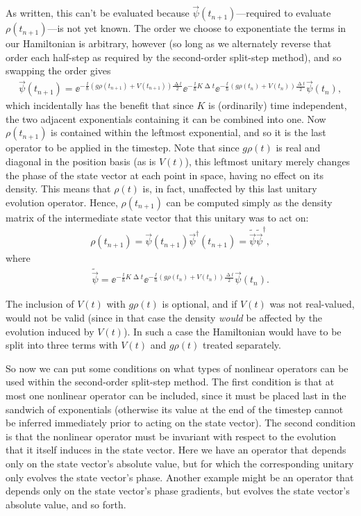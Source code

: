 As written, this can't be evaluated because $\vec \psi(t_{n+1})$---required to evaluate $\rho(t_{n+1})$---is not yet known. The order we choose to exponentiate the terms in our Hamiltonian is arbitrary, however (so long as we alternately reverse that order each half-step as required by the second-order split-step method),
and so swapping the order gives
\begin{align}
\vec \psi(t_{n+1}) =
\ee^{-\frac\ii\hbar (g\rho(t_{n+1}) + V(t_{n+1})) \frac{\upDelta t} 2}
\ee^{-\frac\ii\hbar K \upDelta t}
\ee^{-\frac\ii\hbar (g\rho(t_n) + V(t_n) ) \frac{\upDelta t} 2}
\vec \psi(t_n),
\end{align}
which incidentally has the benefit that since $K$ is (ordinarily) time independent, the two adjacent exponentials containing it can be combined into one. Now $\rho(t_{n+1})$ is contained within the leftmost exponential, and so it is the last operator to be applied in the timestep. Note that since $g\rho(t)$ is real and diagonal in the position basis (as is $V(t)$), this leftmost unitary merely changes the phase of the state vector at each point in space, having no effect on its density. This means that $\rho(t)$ is, in fact, unaffected by this last unitary evolution operator. Hence, $\rho(t_{n+1})$ can be computed simply as the density matrix of the intermediate state vector that this unitary was to act on:
\begin{align}
\rho(t_{n+1}) = \vec\psi(t_{n+1})\vec\psi^\dagger(t_{n+1}) = \tilde{\vec\psi}\tilde{\vec\psi}^\dagger,
\end{align}
where
\begin{align}
\tilde{\vec\psi} = 
\ee^{-\frac\ii\hbar K \upDelta t}
\ee^{-\frac\ii\hbar (g\rho(t_n) + V(t_n) ) \frac{\upDelta t} 2}
\vec \psi(t_n).
\end{align}

The inclusion of $V(t)$ with $g\rho(t)$ is optional, and if $V(t)$ was not real-valued, would not be valid (since in that case the density \emph{would} be affected by the evolution induced by $V(t)$). In such a case the Hamiltonian would have to be split into three terms with $V(t)$ and $g\rho(t)$ treated separately.

So now we can put some conditions on what types of nonlinear operators can be used within the second-order split-step method. The first condition is that at most one nonlinear operator can be included, since it must be placed last in the sandwich of exponentials (otherwise its value at the end of the timestep cannot be inferred immediately prior to acting on the state vector). The second condition is that the nonlinear operator must be invariant with respect to the evolution that it itself induces in the state vector. Here we have an operator that  depends only on the state vector's absolute value, but for which the corresponding unitary only evolves the state vector's phase. Another example might be an operator that depends only on the state vector's phase gradients, but evolves the state vector's absolute value, and so forth.

